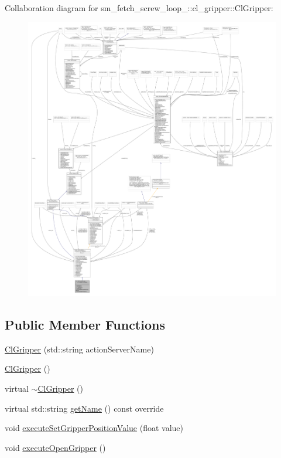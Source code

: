 Collaboration diagram for sm\+\_\+fetch\+\_\+screw\+\_\+loop\+\_\+:\+:cl\+\_\+gripper\+:\+:Cl\+Gripper\+:
\nopagebreak
\begin{figure}[H]
\begin{center}
\leavevmode
\includegraphics[width=350pt]{classsm__fetch__screw__loop__1_1_1cl__gripper_1_1ClGripper__coll__graph}
\end{center}
\end{figure}
\subsection*{Public Member Functions}
\begin{DoxyCompactItemize}
\item 
\hyperlink{classsm__fetch__screw__loop__1_1_1cl__gripper_1_1ClGripper_acdf1b06a5c6a13eca7c4334737ae46d1}{Cl\+Gripper} (std\+::string action\+Server\+Name)
\item 
\hyperlink{classsm__fetch__screw__loop__1_1_1cl__gripper_1_1ClGripper_ada5d0faab20210b9e5374e7d6a654789}{Cl\+Gripper} ()
\item 
virtual \hyperlink{classsm__fetch__screw__loop__1_1_1cl__gripper_1_1ClGripper_a0858a957627f6bedfee8d532c6158a68}{$\sim$\+Cl\+Gripper} ()
\item 
virtual std\+::string \hyperlink{classsm__fetch__screw__loop__1_1_1cl__gripper_1_1ClGripper_a4ccd942c59f65959af1d2c54253fd3f2}{get\+Name} () const override
\item 
void \hyperlink{classsm__fetch__screw__loop__1_1_1cl__gripper_1_1ClGripper_a94665e542f57bc46fbe401707e5a0064}{execute\+Set\+Gripper\+Position\+Value} (float value)
\item 
void \hyperlink{classsm__fetch__screw__loop__1_1_1cl__gripper_1_1ClGripper_aa3f5c08295870689a326050f7f6d51f6}{execute\+Open\+Gripper} ()
\end{DoxyCompactItemize}
